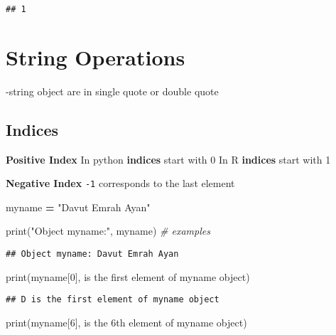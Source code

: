 \documentclass[
]{book}
\newenvironment{Shaded}{\begin{snugshade}}{\end{snugshade}}
\newcommand{\BuiltInTok}[1]{#1}
\newcommand{\CommentTok}[1]{\textcolor[rgb]{0.56,0.35,0.01}{\textit{#1}}}
\newcommand{\DecValTok}[1]{\textcolor[rgb]{0.00,0.00,0.81}{#1}}
\newcommand{\NormalTok}[1]{#1}
\newcommand{\OperatorTok}[1]{\textcolor[rgb]{0.81,0.36,0.00}{\textbf{#1}}}
\newcommand{\StringTok}[1]{\textcolor[rgb]{0.31,0.60,0.02}{#1}}
\begin{document}
\begin{verbatim}
## 1
\end{verbatim}

\hypertarget{string-operations}{%
\section{String Operations}\label{string-operations}}

-string object are in single quote or double quote

\hypertarget{indices}{%
\subsection{Indices}\label{indices}}

\textbf{Positive Index}
In python \textbf{indices} start with 0
In R \textbf{indices} start with 1

\textbf{Negative Index}
\texttt{-1} corresponds to the last element

\begin{Shaded}
\begin{Highlighting}[]
\NormalTok{myname }\OperatorTok{=} \StringTok{"Davut Emrah Ayan"}

\BuiltInTok{print}\NormalTok{(}\StringTok{"Object myname:"}\NormalTok{, myname)}
\CommentTok{\# examples}
\end{Highlighting}
\end{Shaded}

\begin{verbatim}
## Object myname: Davut Emrah Ayan
\end{verbatim}

\begin{Shaded}
\begin{Highlighting}[]
\BuiltInTok{print}\NormalTok{(myname[}\DecValTok{0}\NormalTok{], }\StringTok{\textquotesingle{}is the first element of myname object\textquotesingle{}}\NormalTok{)}
\end{Highlighting}
\end{Shaded}

\begin{verbatim}
## D is the first element of myname object
\end{verbatim}

\begin{Shaded}
\begin{Highlighting}[]
\BuiltInTok{print}\NormalTok{(myname[}\DecValTok{6}\NormalTok{], }\StringTok{\textquotesingle{}is the 6th element of myname object\textquotesingle{}}\NormalTok{)}
\end{Highlighting}
\end{Shaded}
\end{document}
